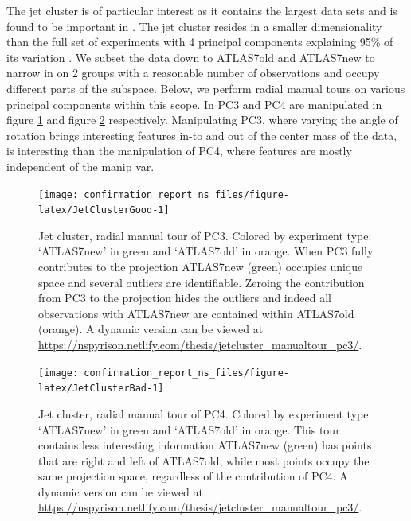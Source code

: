 \documentclass{monashthesis}
\begin{document}
The jet cluster is of particular interest as it contains the largest
data sets and is found to be important in
\textcite{wang_visualizing_2018}. The jet cluster resides in a smaller
dimensionality than the full set of experiments with 4 principal
components explaining 95\% of its variation
\autocite{cook_dynamical_2018}. We subset the data down to ATLAS7old and
ATLAS7new to narrow in on 2 groups with a reasonable number of
observations and occupy different parts of the subspace. Below, we
perform radial manual tours on various principal components within this
scope. In PC3 and PC4 are manipulated in figure \ref{fig:JetClusterGood}
and figure \ref{fig:JetClusterBad} respectively. Manipulating PC3, where
varying the angle of rotation brings interesting features in-to and out
of the center mass of the data, is interesting than the manipulation of
PC4, where features are mostly independent of the manip var.










\begin{figure}

{\centering \texttt{[image: confirmation\_report\_ns\_files/figure-latex/JetClusterGood-1]} 

}

\caption{Jet cluster, radial manual tour of PC3. Colored
by experiment type: `ATLAS7new' in green and `ATLAS7old' in orange. When
PC3 fully contributes to the projection ATLAS7new (green) occupies
unique space and several outliers are identifiable. Zeroing the
contribution from PC3 to the projection hides the outliers and indeed
all observations with ATLAS7new are contained within ATLAS7old (orange).
A dynamic version can be viewed at
\url{https://nspyrison.netlify.com/thesis/jetcluster_manualtour_pc3/}.}\label{fig:JetClusterGood}
\end{figure}









\begin{figure}

{\centering \texttt{[image: confirmation\_report\_ns\_files/figure-latex/JetClusterBad-1]} 

}

\caption{Jet cluster, radial manual tour of PC4. Colored
by experiment type: `ATLAS7new' in green and `ATLAS7old' in orange. This
tour contains less interesting information ATLAS7new (green) has points
that are right and left of ATLAS7old, while most points occupy the same
projection space, regardless of the contribution of PC4. A dynamic
version can be viewed at
\url{https://nspyrison.netlify.com/thesis/jetcluster_manualtour_pc3/}.}\label{fig:JetClusterBad}
\end{figure}
\end{document}
